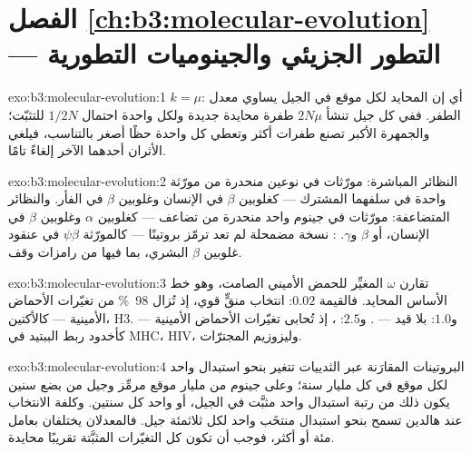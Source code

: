\section*{الفصل \ref{ch:b3:molecular-evolution} --- التطور الجزيئي والجينوميات التطورية}

\begin{solution}{exo:b3:molecular-evolution:1}
$k = \mu$: أي إن  المحايد لكل موقع في الجيل
يساوي معدل الطفر. ففي كل جيل تنشأ $2N\mu$ طفرة محايدة جديدة
ولكل واحدة احتمال $1/2N$ للتثبّت؛ والجمهرة الأكبر تصنع
طفرات أكثر وتعطي كل واحدة حظًا أصغر بالتناسب، فيلغي الأثران
أحدهما الآخر إلغاءً تامًا.
\end{solution}

\begin{solution}{exo:b3:molecular-evolution:2}
النظائر المباشرة: مورّثات في نوعين منحدرة من مورّثة واحدة في
سلفهما المشترك --- كغلوبين $\beta$ في الإنسان وغلوبين $\beta$ في الفأر.
والنظائر المتضاعفة: مورّثات في جينوم واحد منحدرة من تضاعف ---
كغلوبين $\alpha$ وغلوبين $\beta$ في الإنسان، أو $\beta$ و$\gamma$. :
نسخة مضمحلة لم تعد ترمّز بروتينًا --- كالمورّثة $\psi\beta$
في عنقود غلوبين $\beta$ البشري، بما فيها من رامزات وقف.
\end{solution}

\begin{solution}{exo:b3:molecular-evolution:3}
تقارن $\omega$  المغيِّر للحمض الأميني  الصامت، وهو خط الأساس المحايد. فالقيمة $0.02$:
انتخاب منقٍّ قوي، إذ تُزال \qty{98}{\%} من تغيّرات الأحماض الأمينية
--- كالأكتين،  H3. و$1.0$: بلا قيد --- . و$2.5$:
، إذ تُحابى تغيّرات الأحماض الأمينية --- كأخدود
ربط الببتيد في MHC،  HIV، وليزوزيم المجترّات.
\end{solution}

\begin{solution}{exo:b3:molecular-evolution:4}
البروتينات المقارَنة عبر الثدييات تتغير بنحو استبدال واحد لكل
موقع في كل مليار سنة؛ وعلى جينوم من مليار موقع مرمِّز وجيل
من بضع سنين يكون ذلك من رتبة استبدال واحد
مثبَّت في الجيل، أو واحد كل سنتين. وكلفة الانتخاب
عند هالدين تسمح بنحو استبدال منتخَب واحد لكل ثلاثمئة
جيل. فالمعدلان يختلفان بعامل مئة أو أكثر، فوجب أن تكون
كل التغيّرات المثبَّتة تقريبًا محايدة.
\end{solution}

